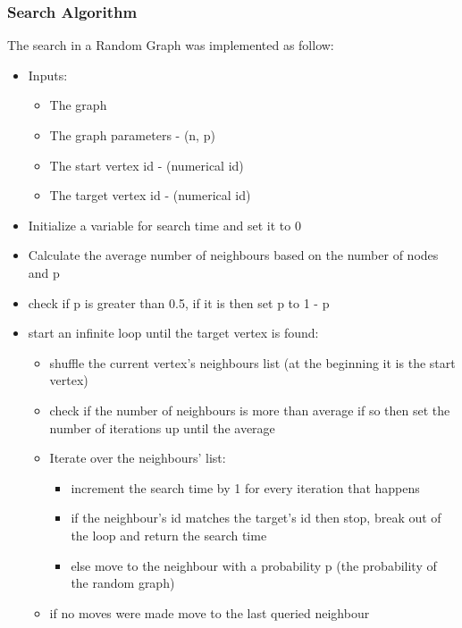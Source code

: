 \documentclass[11pt,a4paper,notitlepage]{article}
\begin{document}
\subsubsection*{Search Algorithm}
The search in a Random Graph was implemented as follow:
\begin{itemize}
    \item Inputs:
    \begin{itemize}
        \item The graph
        \item The graph parameters - (n, p)
        \item The start vertex id - (numerical id)
        \item The target vertex id - (numerical id)
    \end{itemize}
    \item Initialize a variable for search time and set it to 0
    \item Calculate the average number of neighbours based on the number of nodes and p
    \item check if p is greater than 0.5, if it is then set p to 1 - p
    \item start an infinite loop until the target vertex is found:
    \begin{itemize}
        \item shuffle the current vertex's neighbours list (at the beginning it is the start vertex)
        \item check if the number of neighbours is more than average if so then set the number of iterations up until the average
        \item Iterate over the neighbours' list:
        \begin{itemize}
            \item increment the search time by 1 for every iteration that happens
            \item if the neighbour's id matches the target's id then stop, break out of the loop and return the search time
            \item else move to the neighbour with a probability p (the probability of the random graph)
        \end{itemize}
        \item if no moves were made move to the last queried neighbour
    \end{itemize}
\end{itemize}
\end{document}
